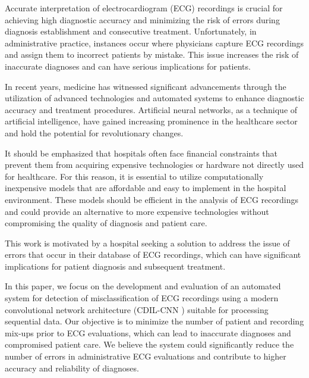 \documentclass[preprint,12pt]{elsarticle}
\begin{document}
Accurate interpretation of electrocardiogram (ECG) recordings is crucial for achieving high diagnostic accuracy and minimizing the risk of errors during diagnosis establishment and consecutive treatment. Unfortunately, in administrative practice, instances occur where physicians capture ECG recordings and assign them to incorrect patients by mistake. This issue increases the risk of inaccurate diagnoses and can have serious implications for patients.

In recent years, medicine has witnessed significant advancements through the utilization of advanced technologies and automated systems to enhance diagnostic accuracy and treatment procedures. Artificial neural networks, as a technique of artificial intelligence, have gained increasing prominence in the healthcare sector and hold the potential for revolutionary changes.

It should be emphasized that hospitals often face financial constraints that prevent them from acquiring expensive technologies or hardware not directly used for healthcare. For this reason, it is essential to utilize computationally inexpensive models that are affordable and easy to implement in the hospital environment. These models should be efficient in the analysis of ECG recordings and could provide an alternative to more expensive technologies without compromising the quality of diagnosis and patient care. 



This work is motivated by a hospital seeking a solution to address the issue of errors that occur in their database of ECG recordings, which can have significant implications for patient diagnosis and subsequent treatment.

In this paper, we focus on the development and evaluation of an automated system for detection of misclassification of ECG recordings using a modern convolutional network architecture (CDIL-CNN \cite{cheng2023classification}) suitable for processing sequential data. Our objective is to minimize the number of patient and recording mix-ups prior to ECG evaluations, which can lead to inaccurate diagnoses and compromised patient care. We believe the system could significantly reduce the number of errors in administrative ECG evaluations and contribute to higher accuracy and reliability of diagnoses. 
\end{document}
